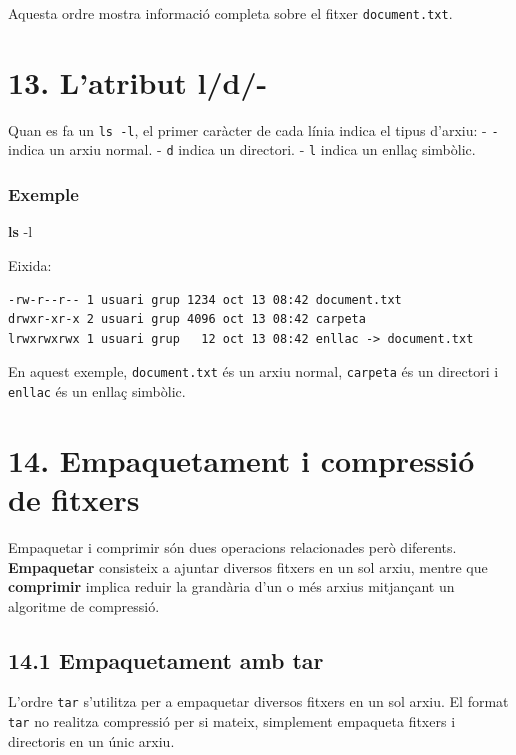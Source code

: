 \documentclass[
  12 pt,
  a4paper,
]{article}
\newenvironment{Shaded}{\begin{snugshade}}{\end{snugshade}}
\newcommand{\AttributeTok}[1]{\textcolor[rgb]{0.13,0.29,0.53}{#1}}
\newcommand{\FunctionTok}[1]{\textcolor[rgb]{0.13,0.29,0.53}{\textbf{#1}}}
\begin{document}
Aquesta ordre mostra informació completa sobre el fitxer
\texttt{document.txt}.

\section{13. L'atribut l/d/-}\label{latribut-ld-}

Quan es fa un \texttt{ls\ -l}, el primer caràcter de cada línia indica
el tipus d'arxiu: - \texttt{-} indica un arxiu normal. - \texttt{d}
indica un directori. - \texttt{l} indica un enllaç simbòlic.

\subsubsection{Exemple}\label{exemple-5}

\begin{Shaded}
\begin{Highlighting}[]
\FunctionTok{ls} \AttributeTok{{-}l}
\end{Highlighting}
\end{Shaded}

Eixida:

\begin{verbatim}
-rw-r--r-- 1 usuari grup 1234 oct 13 08:42 document.txt
drwxr-xr-x 2 usuari grup 4096 oct 13 08:42 carpeta
lrwxrwxrwx 1 usuari grup   12 oct 13 08:42 enllac -> document.txt
\end{verbatim}

En aquest exemple, \texttt{document.txt} és un arxiu normal,
\texttt{carpeta} és un directori i \texttt{enllac} és un enllaç
simbòlic.

\section{14. Empaquetament i compressió de
fitxers}\label{empaquetament-i-compressiuxf3-de-fitxers}

Empaquetar i comprimir són dues operacions relacionades però diferents.
\textbf{Empaquetar} consisteix a ajuntar diversos fitxers en un sol
arxiu, mentre que \textbf{comprimir} implica reduir la grandària d'un o
més arxius mitjançant un algoritme de compressió.

\subsection{14.1 Empaquetament amb tar}\label{empaquetament-amb-tar}

L'ordre \texttt{tar} s'utilitza per a empaquetar diversos fitxers en un
sol arxiu. El format \texttt{tar} no realitza compressió per si mateix,
simplement empaqueta fitxers i directoris en un únic arxiu.
\end{document}
